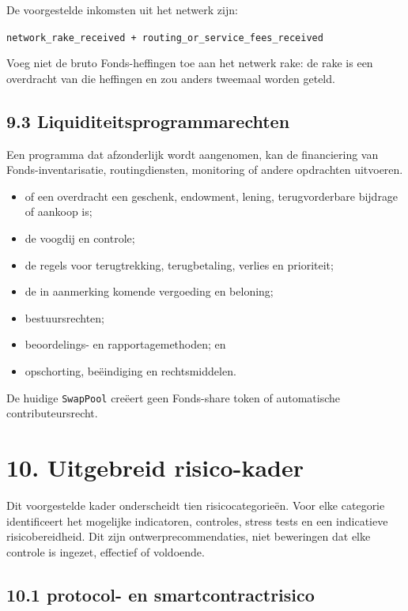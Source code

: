 \documentclass[11pt]{article}
\begin{document}
De voorgestelde inkomsten uit het netwerk zijn:

\texttt{network\_rake\_received + routing\_or\_service\_fees\_received}

Voeg niet de bruto Fonds-heffingen toe aan het netwerk rake: de rake is een overdracht van die heffingen en zou anders tweemaal worden geteld.

\subsection*{9.3 Liquiditeitsprogrammarechten}

Een programma dat afzonderlijk wordt aangenomen, kan de financiering van Fonds-inventarisatie, routingdiensten, monitoring of andere opdrachten uitvoeren.

\begin{itemize}[leftmargin=*]
\item of een overdracht een geschenk, endowment, lening, terugvorderbare bijdrage of aankoop is;
\item de voogdij en controle;
\item de regels voor terugtrekking, terugbetaling, verlies en prioriteit;
\item de in aanmerking komende vergoeding en beloning;
\item bestuursrechten;
\item beoordelings- en rapportagemethoden; en
\item opschorting, beëindiging en rechtsmiddelen.
\end{itemize}
De huidige \texttt{SwapPool} creëert geen Fonds-share token of automatische contributeursrecht.


\section*{10. Uitgebreid risico-kader}

Dit voorgestelde kader onderscheidt tien risicocategorieën. Voor elke categorie identificeert het mogelijke indicatoren, controles, stress tests en een indicatieve risicobereidheid. Dit zijn ontwerprecommendaties, niet beweringen dat elke controle is ingezet, effectief of voldoende.

\subsection*{10.1 protocol- en smartcontractrisico}
\end{document}
